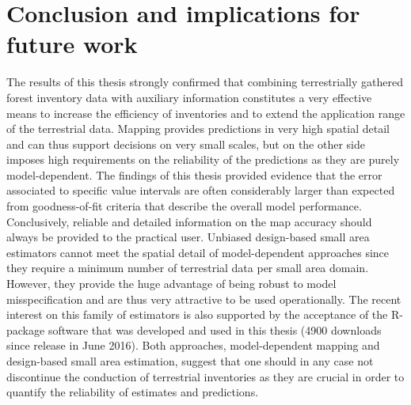 


\section{Conclusion and implications for future work}
\label{sec:synth:future}

The results of this thesis strongly confirmed that combining terrestrially gathered forest inventory data with auxiliary information constitutes a very effective means to increase the efficiency of inventories and to extend the application range of the terrestrial data. Mapping provides predictions in very high spatial detail and can thus support decisions on very small scales, but on the other side imposes high requirements on the reliability of the predictions as they are purely model-dependent. The findings of this thesis provided evidence that the error associated to specific value intervals are often considerably larger than expected from goodness-of-fit criteria that describe the overall model performance. Conclusively, reliable and detailed information on the map accuracy should always be provided to the practical user. Unbiased design-based small area estimators cannot meet the spatial detail of model-dependent approaches since they require a minimum number of terrestrial data per small area domain. However, they provide the huge advantage of being robust to model misspecification and are thus very attractive to be used operationally. The recent interest on this family of estimators is also supported by the acceptance of the R-package software that was developed and used in this thesis (4900 downloads since release in June 2016). Both approaches, model-dependent mapping and design-based small area estimation, suggest that one should in any case not discontinue the conduction of terrestrial inventories as they are crucial in order to quantify the reliability of estimates and predictions.\par


